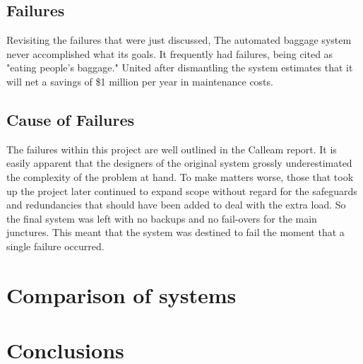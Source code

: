 \documentclass[conference]{IEEEtran}
\begin{document}
	\subsection{Failures}
		Revisiting the failures that were just discussed, The automated baggage system never accomplished what its goals. It frequently had failures, being cited as "eating people's baggage."\cite{dia_calleam} United after dismantling the system estimates that it will net a savings of \$1 million per year in maintenance costs.\cite{dia_nbc} 
	\subsection{Cause of Failures}
		The failures within this project are well outlined in the Calleam report. It is easily apparent that the designers of the original system grossly underestimated the complexity of the problem at hand. To make matters worse, those that took up the project later continued to expand scope without regard for the safeguards and redundancies that should have been added to deal with the extra load. So the final system was left with no backups and no fail-overs for the main junctures. This meant that the system was destined to fail the moment that a single failure occurred. \cite{dia_calleam}
\section{Comparison of systems}

\section{Conclusions}



\end{document}

